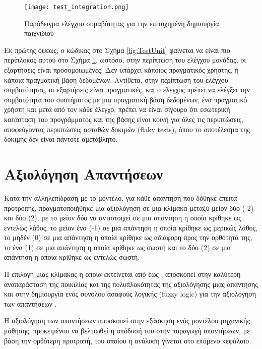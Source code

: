 \begin{figure}[H]
  \begin{center}
    \texttt{[image: test\_integration.png]}
    \caption{Παράδειγμα ελέγχου συμαβότητας για την επιτυχημένη
      δημιουργία παιχνιδιού}
  \end{center}
  \label{fig:TestIntegration}
\end{figure}

Εκ πρώτης όψεως, ο κώδικας στο Σχήμα \ref{fig:TestUnit} φαίνεται να
είναι πιο περίπλοκος αυτού στο Σχήμα \ref{fig:TestIntegration}, ωστόσο,
στην περίπτωση του ελέγχου μονάδας, οι εξαρτήσεις είναι προσομοιωμένες.
Δεν υπάρχει κάποιος πραγματικός χρήστης, ή κάποια πραγματική βάση
δεδομένων. Αντίθετα, στην περίπτωση του ελέγχου συμβατότητας, οι
εξαρτήσεις είναι πραγματικές, και ο έλεγχος πρέπει να ελέγξει την
συμβατότητα του συστήματος με μια πραγματική βάση δεδομένων, ένα
πραγματικό χρήστη και μετά από τον κάθε έλεγχο, πρέπει να είναι σίγουρο
ότι εσωτερική κατάσταση του προγράμματος και της βάσης είναι κοινή για
όλες τις περιπτώσεις, αποφεύγοντας περιπτώσεις ασταθών δοκιμών
(\textlatin{flaky tests}), όπου το αποτέλεσμα της δοκιμής δεν είναι
πάντοτε αμετάβλητο. \cite{Parry2022}

\section{Αξιολόγηση Απαντήσεων}

Κατά την αλληλεπίδραση με το μοντέλο, για κάθε απάντηση που δόθηκε
έπειτα προτροπής, πραγματοποιήθηκε μια αξιολόγηση σε μια κλίμακα μεταξύ
μείον δύο (-2) και δύο (2), με το μείον δύο να αντιστοιχεί σε μια
απάντηση η οποία κρίθηκε ως εντελώς λάθος, το μείον ένα (-1) σε μια
απάντηση η οποία κρίθηκε ως μερικώς λάθος, το μηδέν (0) σε μια απάντηση
η οποία κρίθηκε ως αδιάφορη προς την ορθότητά της, το ένα (1) σε μια
απάντηση η οποία κρίθηκε ως σωστή και το δύο (2) σε μια απάντηση η οποία
κρίθηκε ως εντελώς σωστή.

Η επιλογή μιας κλίμακας η οποία εκτείνεται από  έως
, αποσκοπεί στην καλύτερη αναπαράσταση της ποικιλίας και
της πολυπλοκότητας της αξιολόγησης μιας απάντησης και στην δημιουργία
ενός συνόλου ασαφούς λογικής (\textlatin{fuzzy logic}) για την
αξιολόγηση των απαντήσεων
\cite{ZADEH1965338,klir1995fuzzy,ross2010fuzzy}.

Η αξιολόγηση των απαντήσεων αποσκοπεί στην εξάσκηση ενός μοντέλου
μηχανικής μάθησης, προκειμένου να βελτιωθεί η απόδοσή του στην παραγωγή
απαντήσεων, με βάση την ορθότερη προτροπή, του οποίου η ανάλυση γίνεται
στο επόμενο κεφάλαιο.

